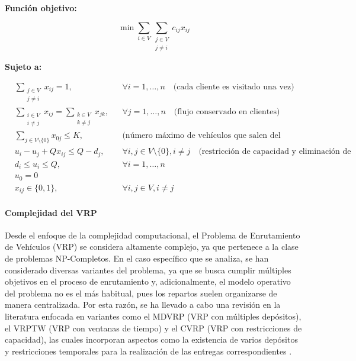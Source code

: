 \documentclass[12pt,titlepage,twoside,openright]{book}
\begin{document}
\textbf{Función objetivo:}

\begin{equation}
	\min \sum_{i \in V} \sum_{\substack{j \in V \\ j \neq i}} c_{ij} x_{ij}
\end{equation}

\medskip

\textbf{Sujeto a:}

\begin{align}
	 & \sum_{\substack{j \in V                                                                                                                                           \\ j \neq i}} x_{ij} = 1, && \forall i = 1, \ldots, n \quad \text{(cada cliente es visitado una vez)} \\
	 & \sum_{\substack{i \in V                                                                                                                                           \\ i \neq j}} x_{ij} = \sum_{\substack{k \in V \\ k \neq j}} x_{jk}, && \forall j = 1, \ldots, n \quad \text{(flujo conservado en clientes)} \\
	 & \sum_{j \in V \setminus \{0\}} x_{0j} \leq K, &  & \text{(número máximo de vehículos que salen del depósito)}                                                     \\
	 & u_i - u_j + Q x_{ij} \leq Q - d_j,            &  & \forall i,j \in V \setminus \{0\}, i \neq j \quad \text{(restricción de capacidad y eliminación de subciclos)} \\
	 & d_i \leq u_i \leq Q,                          &  & \forall i=1, \ldots, n                                                                                         \\
	 & u_0 = 0                                                                                                                                                           \\
	 & x_{ij} \in \{0,1\},                           &  & \forall i,j \in V, i \neq j
\end{align}


\paragraph{Complejidad del VRP}
Desde el enfoque de la complejidad computacional, el Problema de Enrutamiento de Vehículos (VRP) se considera altamente complejo, ya que pertenece a la clase de problemas NP-Completos. En el caso específico que se analiza, se han considerado diversas variantes del problema, ya que se busca cumplir múltiples objetivos en el proceso de enrutamiento y, adicionalmente, el modelo operativo del problema no es el más habitual, pues los repartos suelen organizarse de manera centralizada. Por esta razón, se ha llevado a cabo una revisión en la literatura enfocada en variantes como el MDVRP (VRP con múltiples depósitos), el VRPTW (VRP con ventanas de tiempo) y el CVRP (VRP con restricciones de capacidad), las cuales incorporan aspectos como la existencia de varios depósitos y restricciones temporales para la realización de las entregas correspondientes \cite{pino2011}.
\end{document}
